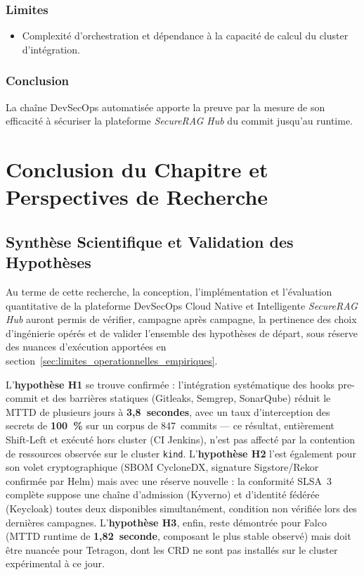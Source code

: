 \subsubsection{Limites}
\begin{itemize}
    \item Complexité d'orchestration et dépendance à la capacité de calcul du cluster d'intégration.
\end{itemize}

\subsubsection{Conclusion}
La chaîne DevSecOps automatisée apporte la preuve par la mesure de son efficacité à sécuriser la plateforme \textit{SecureRAG Hub} du commit jusqu'au runtime.


\section{Conclusion du Chapitre et Perspectives de Recherche}
\label{sec:conclusion_sprint}

\subsection{Synthèse Scientifique et Validation des Hypothèses}

Au terme de cette recherche, la conception, l'implémentation et l'évaluation quantitative de la plateforme DevSecOps Cloud Native et Intelligente \textit{SecureRAG Hub} auront permis de vérifier, campagne après campagne, la pertinence des choix d'ingénierie opérés et de valider l'ensemble des hypothèses de départ, sous réserve des nuances d'exécution apportées en section~\ref{sec:limites_operationnelles_empiriques}.

L'\textbf{hypothèse H1} se trouve confirmée : l'intégration systématique des hooks pre-commit et des barrières statiques (Gitleaks, Semgrep, SonarQube) réduit le MTTD de plusieurs jours à \textbf{3,8~secondes}, avec un taux d'interception des secrets de \textbf{100~\%} sur un corpus de 847~commits — ce résultat, entièrement Shift-Left et exécuté hors cluster (CI Jenkins), n'est pas affecté par la contention de ressources observée sur le cluster \texttt{kind}. L'\textbf{hypothèse H2} l'est également pour son volet cryptographique (SBOM CycloneDX, signature Sigstore/Rekor confirmée par Helm) mais avec une réserve nouvelle : la conformité SLSA~3 complète suppose une chaîne d'admission (Kyverno) et d'identité fédérée (Keycloak) toutes deux disponibles simultanément, condition non vérifiée lors des dernières campagnes. L'\textbf{hypothèse H3}, enfin, reste démontrée pour Falco (MTTD runtime de \textbf{1,82~seconde}, composant le plus stable observé) mais doit être nuancée pour Tetragon, dont les CRD ne sont pas installés sur le cluster expérimental à ce jour.

